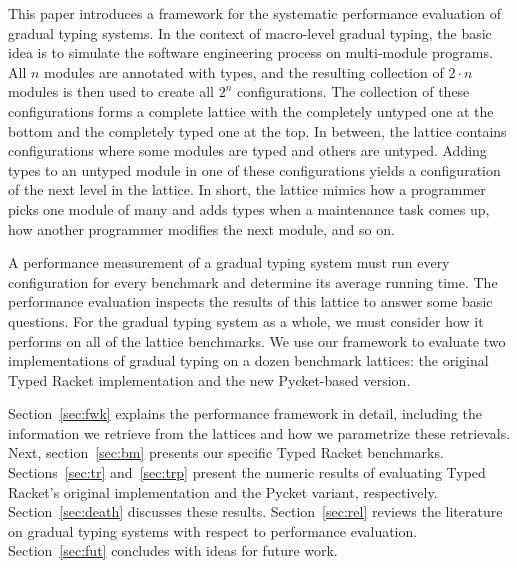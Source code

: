 This paper introduces a framework for the systematic performance evaluation
 of gradual typing systems. In the context of macro-level gradual typing,
 the basic idea is to simulate the software engineering process on
 multi-module programs. All $n$ modules are annotated with types, and the
 resulting collection of $2 \cdot n$ modules is then used to create all
 $2^n$ configurations. The collection of these configurations forms a
 complete lattice with the completely untyped one at the bottom and the
 completely typed one at the top. In between, the lattice contains
 configurations where some modules are typed and others are untyped. Adding
 types to an untyped module in one of these configurations yields a
 configuration of the next level in the lattice. In short, the lattice
 mimics how a programmer picks one module of many and adds types when a
 maintenance task comes up, how another programmer modifies the next
 module, and so on.

A performance measurement of a gradual typing system must run every
 configuration for every benchmark and determine its average running time.
 The performance evaluation inspects the results of this lattice to answer
 some basic questions.  For the gradual typing system as a whole, we must
 consider how it performs on all of the lattice benchmarks. We use our
 framework to evaluate two implementations of gradual typing on a dozen
 benchmark lattices: the original Typed Racket implementation and the new
 Pycket-based version.

Section~\ref{sec:fwk} explains the performance framework in detail,
 including the information we retrieve from the lattices and how we
 parametrize these retrievals. Next, section~\ref{sec:bm} presents our
 specific Typed Racket benchmarks. Sections~\ref{sec:tr} and~\ref{sec:trp}
 present the numeric results of evaluating Typed Racket's original
 implementation and the Pycket variant,
 respectively. Section~\ref{sec:death} discusses these
 results. Section~\ref{sec:rel} reviews the literature on gradual typing
 systems with respect to performance evaluation. Section~\ref{sec:fut}
 concludes with ideas for future work.
